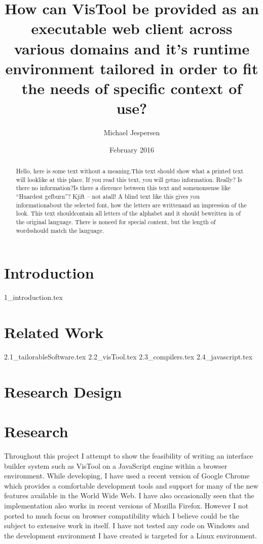 \documentclass[12pt, paperA4]{article}
\title{How can VisTool be provided as an executable web client across various domains and it's runtime environment tailored in order to fit the needs of specific context of use?}
\author{Michael Jespersen}
\date{February 2016}
\begin{document}
\maketitle

\clearpage

\begin{abstract}
Hello, here is some text without a meaning.This text should show what a printed text will looklike at this place. If you read this text, you will getno information.  Really?  Is there no information?Is  there  a  dierence  between  this  text  and  somenonsense like “Huardest gefburn”?  Kjift – not atall!   A  blind  text  like  this  gives  you  informationabout the selected font, how the letters are writtenand  an  impression  of  the  look.   This  text  shouldcontain all letters of the alphabet and it should bewritten  in  of  the  original  language.   There  is  noneed for special content,  but the length of wordsshould match the language.
\end{abstract}

\clearpage

\tableofcontents

\clearpage

\section{Introduction}
{1_introduction.tex}

\section{Related Work}
{2.1_tailorableSoftware.tex}
{2.2_visTool.tex}
{2.3_compilers.tex}
{2.4_javascript.tex}

\section{Research Design}

\section{Research}

Throughout this project I attempt to show the feasibility of writing an interface builder system such as VisTool on a JavaScript engine within a browser environment. While developing, I have used a recent version of Google Chrome which provides a comfortable development tools and support for many of the new features available in the World Wide Web. I have also occasionally seen that the implementation also works in recent versions of Mozilla Firefox. However I not ported to much focus on browser compatibility which I believe could be the subject to extensive work in itself. I have not tested any code on Windows and the development environment I have created is targeted for a Linux environment.
\end{document}
